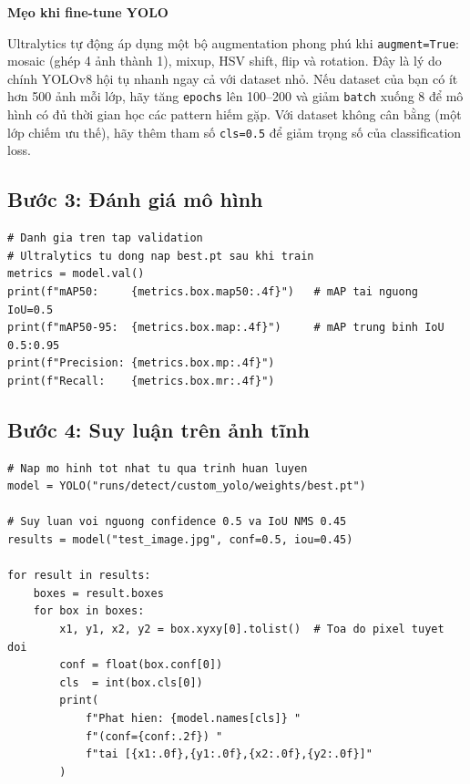 \begin{mdframed}[style=infobox]
\textbf{Mẹo khi fine-tune YOLO}

Ultralytics tự động áp dụng một bộ augmentation phong phú khi \texttt{augment=True}: mosaic (ghép 4 ảnh thành 1), mixup, HSV shift, flip và rotation. Đây là lý do chính YOLOv8 hội tụ nhanh ngay cả với dataset nhỏ. Nếu dataset của bạn có ít hơn 500 ảnh mỗi lớp, hãy tăng \texttt{epochs} lên 100--200 và giảm \texttt{batch} xuống 8 để mô hình có đủ thời gian học các pattern hiếm gặp. Với dataset không cân bằng (một lớp chiếm ưu thế), hãy thêm tham số \texttt{cls=0.5} để giảm trọng số của classification loss.
\end{mdframed}

\subsection{Bước 3: Đánh giá mô hình}
\label{subsec:yolo_eval}

\begin{verbatim}
# Danh gia tren tap validation
# Ultralytics tu dong nap best.pt sau khi train
metrics = model.val()
print(f"mAP50:     {metrics.box.map50:.4f}")   # mAP tai nguong IoU=0.5
print(f"mAP50-95:  {metrics.box.map:.4f}")     # mAP trung binh IoU 0.5:0.95
print(f"Precision: {metrics.box.mp:.4f}")
print(f"Recall:    {metrics.box.mr:.4f}")
\end{verbatim}

\subsection{Bước 4: Suy luận trên ảnh tĩnh}
\label{subsec:yolo_image_inference}

\begin{verbatim}
# Nap mo hinh tot nhat tu qua trinh huan luyen
model = YOLO("runs/detect/custom_yolo/weights/best.pt")

# Suy luan voi nguong confidence 0.5 va IoU NMS 0.45
results = model("test_image.jpg", conf=0.5, iou=0.45)

for result in results:
    boxes = result.boxes
    for box in boxes:
        x1, y1, x2, y2 = box.xyxy[0].tolist()  # Toa do pixel tuyet doi
        conf = float(box.conf[0])
        cls  = int(box.cls[0])
        print(
            f"Phat hien: {model.names[cls]} "
            f"(conf={conf:.2f}) "
            f"tai [{x1:.0f},{y1:.0f},{x2:.0f},{y2:.0f}]"
        )
\end{verbatim}


